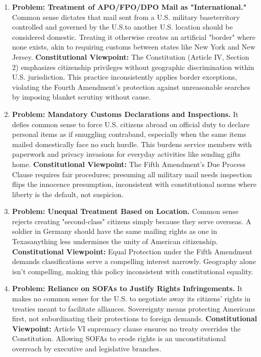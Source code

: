 \begin{enumerate}
\item \textbf{Problem: Treatment of APO/FPO/DPO Mail as "International."}
Common sense dictates that mail sent from a U.S. military baseterritory controlled and governed by the U.S.to another U.S. location should be considered domestic. Treating it otherwise creates an artificial "border" where none exists, akin to requiring customs between states like New York and New Jersey.
\textbf{Constitutional Viewpoint:} The Constitution (Article IV, Section 2) emphasizes citizenship privileges without geographic discrimination within U.S. jurisdiction. This practice inconsistently applies border exceptions, violating the Fourth Amendment's protection against unreasonable searches by imposing blanket scrutiny without cause.

\item \textbf{Problem: Mandatory Customs Declarations and Inspections.}
It defies common sense to force U.S. citizens abroad on official duty to declare personal items as if smuggling contraband, especially when the same items mailed domestically face no such hurdle. This burdens service members with paperwork and privacy invasions for everyday activities like sending gifts home.
\textbf{Constitutional Viewpoint:} The Fifth Amendment's Due Process Clause requires fair procedures; presuming all military mail needs inspection flips the innocence presumption, inconsistent with constitutional norms where liberty is the default, not suspicion.

\item \textbf{Problem: Unequal Treatment Based on Location.}
Common sense rejects creating "second-class" citizens simply because they serve overseas. A soldier in Germany should have the same mailing rights as one in Texasanything less undermines the unity of American citizenship.
\textbf{Constitutional Viewpoint:} Equal Protection under the Fifth Amendment demands classifications serve a compelling interest narrowly. Geography alone isn't compelling, making this policy inconsistent with constitutional equality.

\item \textbf{Problem: Reliance on SOFAs to Justify Rights Infringements.}
It makes no common sense for the U.S. to negotiate away its citizens' rights in treaties meant to facilitate alliances. Sovereignty means protecting Americans first, not subordinating their protections to foreign demands.
\textbf{Constitutional Viewpoint:} Article VI supremacy clause ensures no treaty overrides the Constitution. Allowing SOFAs to erode rights is an unconstitutional overreach by executive and legislative branches.


\end{enumerate}
